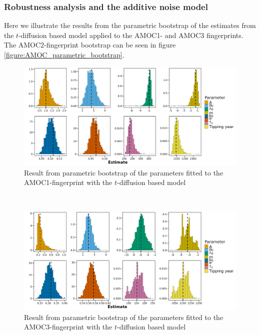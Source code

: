 \subsubsection{Robustness analysis and the additive noise model}\label{subsubsec:RobustnessAnalysisAppendix}
Here we illustrate the results from the parametric bootstrap of the estimates from the $t$-diffusion based model applied to the AMOC1- and AMOC3 fingerprints. The AMOC2-fingerprint bootstrap can be seen in figure \ref{figure:AMOC_parametric_bootstrap}.
\begin{figure}[h!]
    \begin{center}
        \includegraphics[scale = .09]{figures/estim_tibble_AMOC1_plot.jpeg}
        \caption{Result from parametric bootstrap of the parameters fitted to the AMOC1-fingerprint with the $t$-diffusion based model}
        \label{figure:AMOC1_t_diffusion_bootstrap}
    \end{center}
\end{figure}\\
\begin{figure}[h!]
    \begin{center}
        \includegraphics[scale = .09]{figures/estim_tibble_AMOC3_plot.jpeg}
        \caption{Result from parametric bootstrap of the parameters fitted to the AMOC3-fingerprint with the $t$-diffusion based model}
        \label{figure:AMOC3_t_diffusion_bootstrap}
    \end{center}
\end{figure}\\
